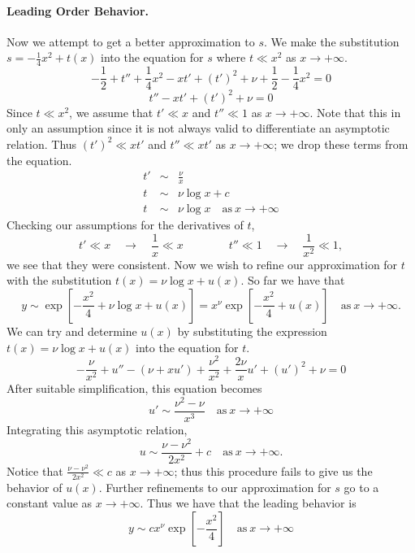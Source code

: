 \paragraph{Leading Order Behavior.}
Now we attempt to get a better approximation to $s$. We make the substitution
$s = -\frac{1}{4} x^2 + t(x)$ into the equation for $s$ where 
$t \ll x^2$ as $x \to +\infty$.
\[ -\frac{1}{2} + t'' + \frac{1}{4} x^2 - x t' + (t')^2 + \nu + \frac{1}{2}
-\frac{1}{4} x^2 = 0 \]
\[ t'' - x t' + (t')^2 + \nu = 0 \]
Since $t \ll x^2$, we assume that $t' \ll x$ and $t'' \ll 1$ as 
$x \to +\infty$.  
Note that this in only an assumption since it is not always valid to
differentiate an asymptotic relation.
Thus $(t')^2 \ll x t'$ and $t'' \ll x t'$ as
$x \to +\infty$; we drop these terms from the equation.  
\begin{eqnarray*}
  t' &\sim& \frac{\nu}{x} \\
  t &\sim& \nu \log x + c \\
  t &\sim& \nu \log x\quad \mathrm{as}\ x \to +\infty
\end{eqnarray*}
Checking our assumptions for the derivatives of $t$,
\[ t' \ll x \quad \to \quad \frac{1}{x} \ll x \qquad \qquad
t'' \ll 1 \quad \to \quad \frac{1}{x^2} \ll 1,\]
we see that they were consistent.  Now we wish to refine our approximation for
$t$ with the substitution $t(x) = \nu \log x + u(x)$.
So far we have that 
\[ y \sim \exp\left[-\frac{x^2}{4} + \nu \log x + u(x)\right] 
= x^\nu \exp\left[-\frac{x^2}{4}+ u(x) \right] 
\quad  \mathrm{as}\ x \to +\infty. \]
We can try and determine $u(x)$ by substituting the expression
$t(x) = \nu \log x + u(x)$ into the equation for $t$. 
\[ -\frac{\nu}{x^2} + u'' - (\nu + x u') + \frac{\nu^2}{x^2} + 
\frac{2\nu}{x} u' + (u')^2 + \nu = 0\]
After suitable simplification, this equation becomes
\[ u' \sim \frac{\nu^2 - \nu}{x^3}\quad \mathrm{as}\ x \to +\infty \]
Integrating this asymptotic relation, 
\[ u \sim \frac{\nu-\nu^2}{2x^2} + c \quad \mathrm{as}\ x \to +\infty. \]
Notice that $\frac{\nu-\nu^2}{2x^2} \ll c$ as $x \to +\infty$;
thus this procedure fails to give us the behavior of $u(x)$.  Further 
refinements to our approximation for $s$ go to a constant value as 
$x \to +\infty$.  Thus we have that the leading behavior is
\[y \sim c x^\nu \exp\left[-\frac{x^2}{4} \right]
\quad \mathrm{as}\ x \to +\infty\]




